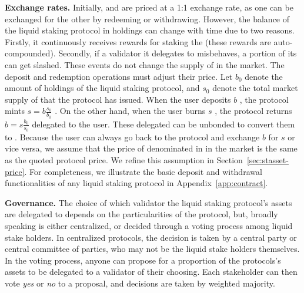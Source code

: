 \noindent
\textbf{Exchange rates.} Initially, \asset and \stasset are priced at a 1:1 exchange rate,
as one can be exchanged for the other by redeeming or withdrawing. However, the balance
of the liquid staking protocol in \asset holdings can change with time due to two reasons.
Firstly, it continuously receives rewards for staking the \asset (these rewards are
auto-compounded). Secondly, if a validator it delegates to misbehaves, a portion of its
\asset can get slashed. These events do not change the supply of \stasset in the market.
The deposit and redemption operations must adjust their price.
Let $b_0$ \asset denote the amount of \asset holdings of the liquid staking
protocol, and $s_0$ \stasset denote the total market supply of \stasset that the protocol
has issued. When the user deposits $b$ \asset, the protocol mints $s = b \frac{s_0}{b_0}$ \stasset.
On the other hand, when the user burns $s$ \asset, the protocol returns $b = s \frac{b_0}{s_0}$
delegated \asset to the user. These delegated \asset can be unbonded to convert them
to \asset. Because the user can always go back to the protocol and exchange $b$ for $s$ or
vice versa, we assume that the price of \stasset denominated in \asset in the
market is the same as the quoted protocol price. We refine this assumption in
Section~\ref{sec:stasset-price}. For completeness, we illustrate the basic deposit and withdrawal
functionalities of any liquid staking protocol in Appendix~\ref{app:contract}.

\noindent
\textbf{Governance.}
The choice of which validator the liquid staking protocol's assets are delegated to
depends on the particularities of the protocol, but, broadly speaking
is either centralized, or decided through a voting process among
liquid stake holders.
In centralized protocols, the decision is taken by a
central party or central committee of parties, who may not be the
liquid stake holders themselves.
In the voting process, anyone can propose for a proportion of the protocols's assets
to be delegated to a validator of their choosing.
Each stakeholder can then vote \emph{yes} or \emph{no}
to a proposal, and decisions are taken by weighted majority.
